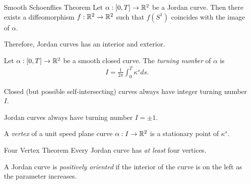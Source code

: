 \begin{thm}{Smooth Schoenflies Theorem}\proofbreak
    Let $\alpha: [0, T] \to \mathbb{R}^2$ be a Jordan curve. Then there exists a diffeomorphism $f: \mathbb{R}^2 \to \mathbb{R}^2$ such that $f(S^1)$ coincides with the image of $\alpha$.
\end{thm}

\begin{rmk}
    Therefore, Jordan curves has an interior and exterior.
\end{rmk}

\begin{defn}
    Let $\alpha: [0, T] \to \mathbb{R}^2$ be a smooth closed curve. The \emph{turning number} of $\alpha$ is
    \begin{align*}
        I = \frac{1}{2\pi}\int_{0}^{T}\kappa^{s}ds.
    \end{align*}
\end{defn}

\begin{thm}
    Closed (but possible self-intersecting) curves always have integer turning number $I$.
\end{thm}

\begin{thm}
    Jordan curves always have turning number $I = \pm 1$.
\end{thm}

\begin{defn}
    A \emph{vertex} of a unit speed plane curve $\alpha: I \to \mathbb{R}^2$ is a stationary point of $\kappa^{s}$.
\end{defn}

\begin{thm}{Four Vertex Theorem}\label{thm:four-vertex-theorem}\proofbreak
    Every Jordan curve has \emph{at least} four vertices.
\end{thm}

\begin{defn}
    A Jordan curve is \emph{positively oriented} if the interior of the curve is on the left as the parameter increases.
\end{defn}

